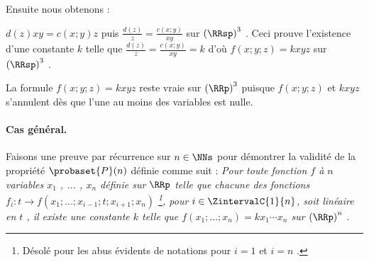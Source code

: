 \medskip

Ensuite nous obtenons :

\smallskip

$d(z) x y = c(x ; y) z$ puis $\frac{d(z)}{z} = \frac{c(x ; y)}{xy}$ sur $\left( \RRsp \right)^3$ . Ceci prouve l'existence d'une constante $k$ telle que $\frac{d(z)}{z} = \frac{c(x ; y)}{xy} = k$ d'où $f(x ; y ; z) = k x y z$ sur $\left( \RRsp \right)^3$ .


\medskip

La formule $f(x ; y ; z) = k x y z$ reste vraie sur $\left( \RRp \right)^3$ puisque $f(x ; y ; z)$ et $k x y z$ s'annulent dès que l'une au moins des variables est nulle.



\paragraph{Cas général.}

Faisons une preuve par récurrence sur $n \in \NNs$ pour démontrer la validité de la propriété $\probaset{P}(n)$ définie comme suit :
\emph{\og Pour toute fonction $f$ à $n$ variables $x_1$ , ... , $x_n$ définie sur $\RRp$ telle que chacune des fonctions $f_i : t \rightarrow f(x_1 ; ... ; x_{i-1} ; t ; x_{i+1} ; x_n)$
\footnote{
	Désolé pour les abus évidents de notations pour $i = 1$ et $i = n$ . 
},
pour $i \in \ZintervalC{1}{n}$, soit linéaire en $t$ , il existe une constante $k$ telle que $f(x_1 ; ... ; x_n) = k x_1 \cdots x_n$ sur $\left( \RRp \right)^n$ \fg}.

